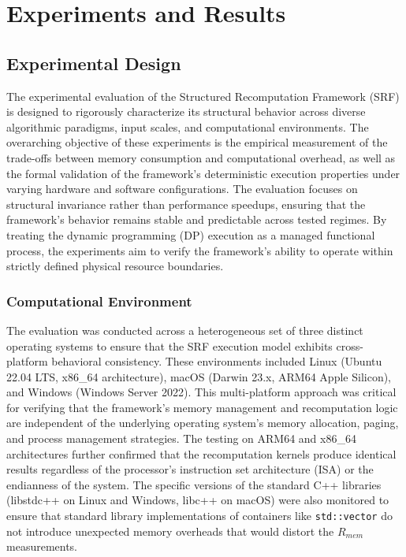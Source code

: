 \section{Experiments and Results}

\subsection{Experimental Design}

The experimental evaluation of the Structured Recomputation Framework (SRF) is designed to rigorously characterize its structural behavior across diverse algorithmic paradigms, input scales, and computational environments. The overarching objective of these experiments is the empirical measurement of the trade-offs between memory consumption and computational overhead, as well as the formal validation of the framework's deterministic execution properties under varying hardware and software configurations. The evaluation focuses on structural invariance rather than performance speedups, ensuring that the framework's behavior remains stable and predictable across tested regimes. By treating the dynamic programming (DP) execution as a managed functional process, the experiments aim to verify the framework's ability to operate within strictly defined physical resource boundaries.

\subsubsection{Computational Environment}

The evaluation was conducted across a heterogeneous set of three distinct operating systems to ensure that the SRF execution model exhibits cross-platform behavioral consistency. These environments included Linux (Ubuntu 22.04 LTS, x86\_64 architecture), macOS (Darwin 23.x, ARM64 Apple Silicon), and Windows (Windows Server 2022). This multi-platform approach was critical for verifying that the framework's memory management and recomputation logic are independent of the underlying operating system's memory allocation, paging, and process management strategies. The testing on ARM64 and x86\_64 architectures further confirmed that the recomputation kernels produce identical results regardless of the processor's instruction set architecture (ISA) or the endianness of the system. The specific versions of the standard C++ libraries (libstdc++ on Linux and Windows, libc++ on macOS) were also monitored to ensure that standard library implementations of containers like \texttt{std::vector} do not introduce unexpected memory overheads that would distort the $R_{mem}$ measurements.

